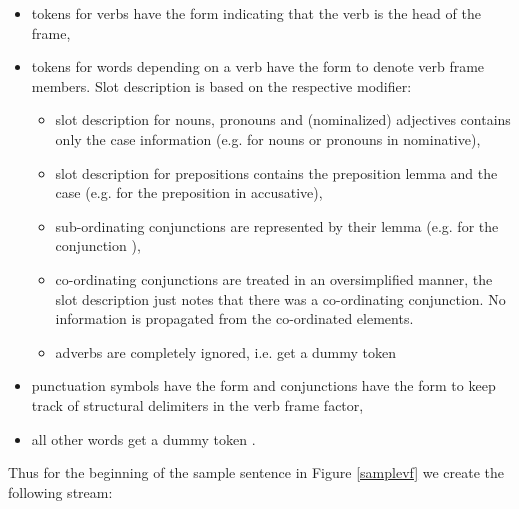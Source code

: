 \documentclass[11pt]{report}
\theoremstyle{plain}
\begin{document}
{{\begin{itemize}

\item tokens for verbs have the form  indicating that the verb is the head of the frame,

\item tokens for words depending on a verb have the form  to denote verb frame members. Slot description is based on the
  respective modifier:
\begin{itemize}

\item slot description for nouns, pronouns and (nominalized) adjectives contains
  only the case information (e.g.  for nouns or pronouns in
  nominative),

\item slot description for prepositions contains the preposition lemma and the
  case (e.g.  for the preposition  in accusative),

\item sub-ordinating conjunctions are represented by their lemma (e.g.
   for the conjunction ),

\item co-ordinating conjunctions are treated in an oversimplified manner, the slot
  description just notes that there was a co-ordinating conjunction. No
  information is propagated from the co-ordinated elements.

\item adverbs are completely ignored, i.e. get a dummy token \text{---}
\end{itemize}

\item punctuation symbols have the form  and
  conjunctions have the form  to
  keep track of structural delimiters in the verb frame factor,

\item all other words get a dummy token \text{---}.
\end{itemize}

Thus for the beginning of the sample sentence in Figure \ref{samplevf}
 we create the following stream:

}}
\end{document}

